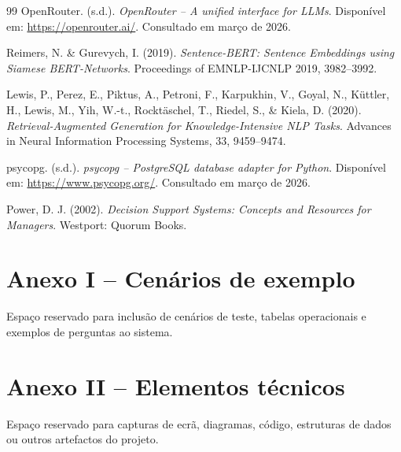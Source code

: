 \documentclass[a4paper,12pt]{report}
\begin{document}
\begin{thebibliography}{99}
OpenRouter. (s.d.). \textit{OpenRouter -- A unified interface for LLMs}. Disponível em: \url{https://openrouter.ai/}. Consultado em março de 2026.

Reimers, N. \& Gurevych, I. (2019). \textit{Sentence-BERT: Sentence Embeddings using Siamese BERT-Networks}. Proceedings of EMNLP-IJCNLP 2019, 3982--3992.

Lewis, P., Perez, E., Piktus, A., Petroni, F., Karpukhin, V., Goyal, N., K{\"u}ttler, H., Lewis, M., Yih, W.-t., Rockt{\"a}schel, T., Riedel, S., \& Kiela, D. (2020). \textit{Retrieval-Augmented Generation for Knowledge-Intensive NLP Tasks}. Advances in Neural Information Processing Systems, 33, 9459--9474.

psycopg. (s.d.). \textit{psycopg -- PostgreSQL database adapter for Python}. Disponível em: \url{https://www.psycopg.org/}. Consultado em março de 2026.

Power, D. J. (2002). \textit{Decision Support Systems: Concepts and Resources for Managers}. Westport: Quorum Books.

\end{thebibliography}

\appendix
\chapter{Anexo I -- Cenários de exemplo}
Espaço reservado para inclusão de cenários de teste, tabelas operacionais e exemplos de perguntas ao sistema.

\chapter{Anexo II -- Elementos técnicos}
Espaço reservado para capturas de ecrã, diagramas, código, estruturas de dados ou outros artefactos do projeto.
\end{document}
